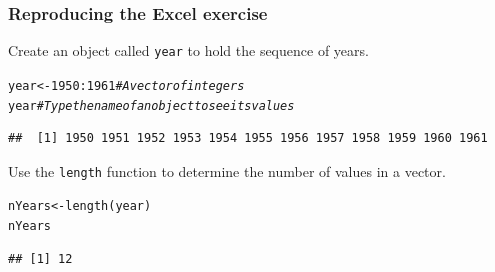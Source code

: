 \documentclass[color=usenames,dvipsnames]{beamer}\usepackage[]{graphicx}\usepackage[]{color}
\makeatletter
\newcommand{\hlnum}[1]{\textcolor[rgb]{0.69,0.494,0}{#1}}%
\newcommand{\hlcom}[1]{\textcolor[rgb]{0.514,0.506,0.514}{\textit{#1}}}%
\newcommand{\hlopt}[1]{\textcolor[rgb]{0,0,0}{#1}}%
\newcommand{\hlstd}[1]{\textcolor[rgb]{0,0,0}{#1}}%
\newcommand{\hlkwb}[1]{\textcolor[rgb]{0,0.341,0.682}{#1}}%
\newcommand{\hlkwd}[1]{\textcolor[rgb]{0.004,0.004,0.506}{#1}}%
\newenvironment{kframe}{%
 \def\at@end@of@kframe{}%
 \ifinner\ifhmode%
  \def\at@end@of@kframe{\end{minipage}}%
  \begin{minipage}{\columnwidth}%
 \fi\fi%
 \def\FrameCommand##1{\hskip\@totalleftmargin \hskip-\fboxsep
 \colorbox{shadecolor}{##1}\hskip-\fboxsep
     \hskip-\linewidth \hskip-\@totalleftmargin \hskip\columnwidth}%
 \MakeFramed {\advance\hsize-\width
   \@totalleftmargin\z@ \linewidth\hsize
   \@setminipage}}%
 {\par\unskip\endMakeFramed%
 \at@end@of@kframe}
\newenvironment{knitrout}{}{} %
\newcommand{\inr}[1]{\colorbox{inlinecolor}{\texttt{#1}}}
\makeatother
\begin{document}
\begin{frame}[fragile]
  \frametitle{Reproducing the Excel exercise}
  Create an object called \inr{year} to hold the sequence of years.
\begin{knitrout}\scriptsize
{}\color{fgcolor}\begin{kframe}
\begin{alltt}
\hlstd{year} \hlkwb{<-} \hlnum{1950}\hlopt{:}\hlnum{1961} \hlcom{# A vector of integers}
\hlstd{year}              \hlcom{# Type the name of an object to see its values}
\end{alltt}
\begin{verbatim}
##  [1] 1950 1951 1952 1953 1954 1955 1956 1957 1958 1959 1960 1961
\end{verbatim}
\end{kframe}
\end{knitrout}
\pause
\vfill
Use the \inr{length} function to determine the number of values in a
vector.
\begin{knitrout}\footnotesize
{}\color{fgcolor}\begin{kframe}
\begin{alltt}
\hlstd{nYears} \hlkwb{<-} \hlkwd{length}\hlstd{(year)}
\hlstd{nYears}
\end{alltt}
\begin{verbatim}
## [1] 12
\end{verbatim}
\end{kframe}
\end{knitrout}
\end{frame}
\end{document}
